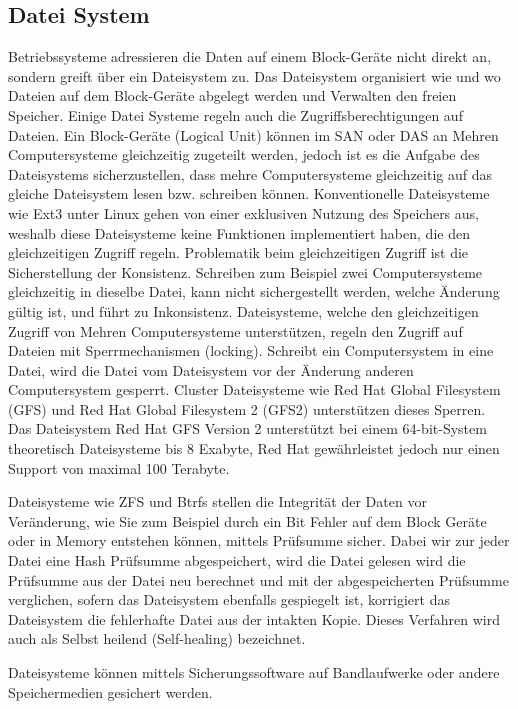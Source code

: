 \subsection{Datei System}
Betriebssysteme adressieren die Daten auf einem Block-Geräte nicht direkt an, sondern greift über ein Dateisystem zu. Das Dateisystem organisiert wie und wo Dateien auf dem Block-Geräte abgelegt werden und Verwalten den freien Speicher. Einige Datei Systeme regeln auch die Zugriffsberechtigungen auf Dateien. Ein Block-Geräte (Logical Unit) können im SAN oder DAS an Mehren Computersysteme gleichzeitig zugeteilt werden, jedoch ist es die Aufgabe des Dateisystems sicherzustellen, dass mehre Computersysteme gleichzeitig auf das gleiche Dateisystem lesen bzw. schreiben können. Konventionelle Dateisysteme wie Ext3 unter Linux gehen von einer exklusiven Nutzung des Speichers aus, weshalb diese Dateisysteme keine Funktionen implementiert haben, die den gleichzeitigen Zugriff regeln. Problematik beim gleichzeitigen Zugriff ist die Sicherstellung der Konsistenz. Schreiben zum Beispiel zwei Computersysteme gleichzeitig in dieselbe Datei, kann nicht sichergestellt werden, welche Änderung gültig ist, und führt zu Inkonsistenz. Dateisysteme, welche den gleichzeitigen Zugriff von Mehren Computersysteme unterstützen, regeln den Zugriff auf Dateien mit Sperrmechanismen (locking). Schreibt ein Computersystem in eine Datei, wird die Datei vom Dateisystem vor der Änderung anderen Computersystem gesperrt. Cluster Dateisysteme wie Red Hat Global Filesystem (GFS) und Red Hat Global Filesystem 2 (GFS2) unterstützen dieses Sperren. Das Dateisystem Red Hat GFS Version 2 unterstützt bei einem 64-bit-System theoretisch Dateisysteme bis 8 Exabyte, Red Hat gewährleistet jedoch nur einen Support von maximal 100 Terabyte.\cite{Levine2011}

Dateisysteme wie ZFS und Btrfs stellen die Integrität der Daten vor Veränderung, wie Sie zum Beispiel durch ein Bit Fehler auf dem Block Geräte oder in Memory entstehen können, mittels Prüfsumme sicher. Dabei wir zur jeder Datei eine Hash Prüfsumme abgespeichert, wird die Datei gelesen wird die Prüfsumme aus der Datei neu berechnet und mit der abgespeicherten Prüfsumme verglichen, sofern das Dateisystem ebenfalls gespiegelt ist, korrigiert das Dateisystem die fehlerhafte Datei aus der intakten Kopie. Dieses Verfahren wird auch als Selbst heilend (Self-healing) bezeichnet. \cite{Bonwick2005}\cite{Oracle}

Dateisysteme können mittels Sicherungssoftware auf Bandlaufwerke oder andere Speichermedien gesichert werden.


